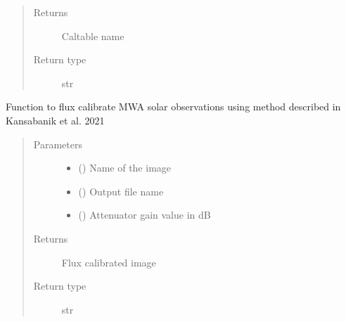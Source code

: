 \documentclass[letterpaper,10pt,english]{sphinxmanual}
\begin{document}
\begin{fulllineitems}
\begin{fulllineitems}
\begin{quote}
\begin{description}
\item[{Returns}] \leavevmode
\sphinxAtStartPar
Caltable name

\item[{Return type}] \leavevmode
\sphinxAtStartPar
str

\end{description}\end{quote}

\end{fulllineitems}


\begin{fulllineitems}
\label{\detokenize{paircars:paircars.fullpol_selfcal_LTS.PolSelfcal.mwa_solar_fluxcal}}
\sphinxAtStartPar
Function to flux calibrate MWA solar observations using method described in Kansabanik et al. 2021
\begin{quote}\begin{description}
\item[{Parameters}] \leavevmode\begin{itemize}
\item {} 
\sphinxAtStartPar
{} () \textendash{} Name of the image

\item {} 
\sphinxAtStartPar
{} () \textendash{} Output file name

\item {} 
\sphinxAtStartPar
{} () \textendash{} Attenuator gain value in dB

\end{itemize}

\item[{Returns}] \leavevmode
\sphinxAtStartPar
Flux calibrated image

\item[{Return type}] \leavevmode
\sphinxAtStartPar
str

\end{description}\end{quote}


\end{fulllineitems}
\end{fulllineitems}
\end{document}
